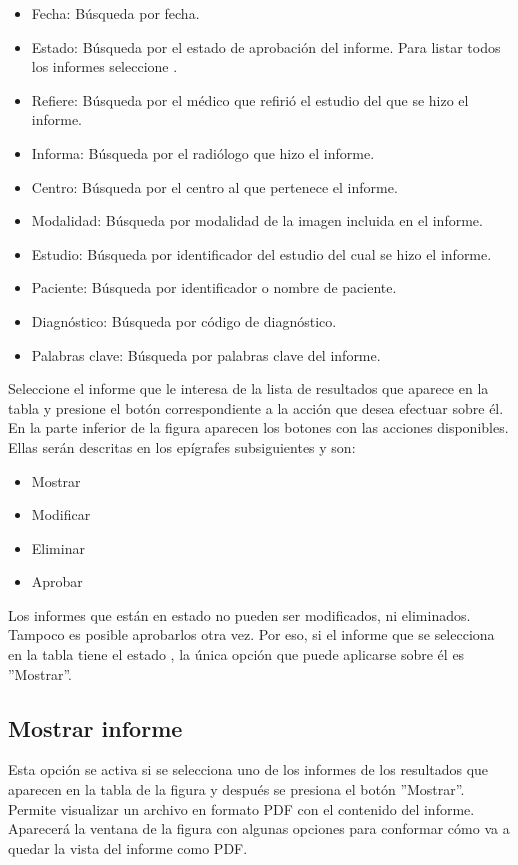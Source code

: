 \documentclass{plantilla-manual-usuario}
\begin{document}
\begin{itemize}
\item Fecha: Búsqueda por fecha.
\item Estado: Búsqueda por el estado de aprobación del informe. Para listar todos los informes seleccione .
\item Refiere: Búsqueda por el médico que refirió el estudio del que se hizo el informe.
\item Informa: Búsqueda por el radiólogo que hizo el informe.
\item Centro: Búsqueda por el centro al que pertenece el informe.
\item Modalidad: Búsqueda por modalidad de la imagen incluida en el informe.
\item Estudio: Búsqueda por identificador del estudio del cual se hizo el informe.
\item Paciente:  Búsqueda por identificador o nombre de paciente.
\item Diagnóstico: Búsqueda por código de diagnóstico.
\item Palabras clave: Búsqueda por palabras clave del informe.
\end{itemize}

Seleccione el informe que le interesa de la lista de resultados que aparece en la tabla y presione el botón correspondiente a la acción que desea efectuar sobre él. En la parte inferior de la figura  aparecen los botones con las acciones disponibles. Ellas serán descritas en los epígrafes subsiguientes y son:

\begin{itemize}
\item Mostrar
\item Modificar
\item Eliminar
\item Aprobar
\end{itemize}

Los informes que están en estado  no pueden ser modificados, ni eliminados. Tampoco es posible aprobarlos otra vez. Por eso, si el informe que se selecciona en la tabla tiene el estado , la única opción que puede aplicarse sobre él es ”Mostrar”.

\subsection{Mostrar informe}\label{subsectionMostrarInforme}
Esta opción se activa si se selecciona uno de los informes de los resultados que aparecen en la tabla de la figura  y después se presiona el botón ”Mostrar”. Permite visualizar un archivo en formato PDF con el contenido del informe. Aparecerá la ventana de la figura  con algunas opciones para conformar cómo va  a quedar la vista del informe como PDF. 
\end{document}
